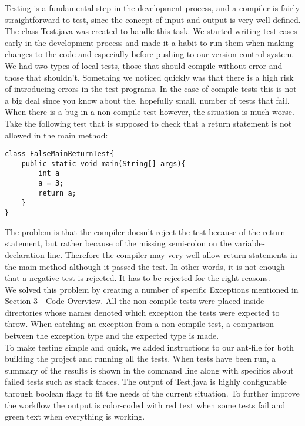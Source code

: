 \documentclass[paper=a4, fontsize=11pt]{scrartcl} %
\numberwithin{equation}{section} %
\numberwithin{figure}{section} %
\numberwithin{table}{section} %
\begin{document}
Testing is a fundamental step in the development process, and a compiler is fairly straightforward to test, since the concept of input and output is very well-defined.
The class Test.java was created to handle this task.
We started writing test-cases early in the development process and made it a habit to run them when making changes to the code and especially before pushing to our version control system.
We had two types of local tests, those that should compile without error and those that shouldn’t.
Something we noticed quickly was that there is a high risk of introducing errors in the test programs.
In the case of compile-tests this is not a big deal since you know about the, hopefully small, number of tests that fail.
When there is a bug in a non-compile test however, the situation is much worse.
Take the following test that is supposed to check that a return statement is not allowed in the main method:
\begin{verbatim}
class FalseMainReturnTest{
    public static void main(String[] args){
        int a
        a = 3;
        return a;
    }
}
\end{verbatim}
The problem is that the compiler doesn’t reject the test because of the return statement, but rather because of the missing semi-colon on the variable-declaration line.
Therefore the compiler may very well allow return statements in the main-method although it passed the test.
In other words, it is not enough that a negative test is rejected.
It has to be rejected for the right reasons.\\

We solved this problem by creating a number of specific Exceptions mentioned in Section 3 - Code Overview.
All the non-compile tests were placed inside directories whose names denoted which exception the tests were expected to throw.
When catching an exception from a non-compile test, a comparison between the exception type and the expected type is made. \\

To make testing simple and quick, we added instructions to our ant-file for both building the project and running all the tests.
When tests have been run, a summary of the results is shown in the command line along with specifics about failed tests such as stack traces.
The output of Test.java is highly configurable through boolean flags to fit the needs of the current situation.
To further improve the workflow the output is color-coded with red text when some tests fail and green text when everything is working.
\end{document}
